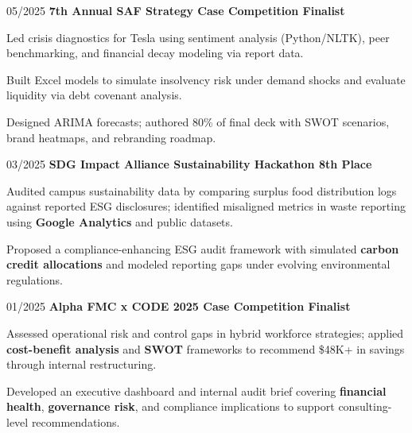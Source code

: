 \begin{twocolentry}{05/2025}
    \textbf{7th Annual SAF Strategy Case Competition Finalist}
\end{twocolentry}
\begin{onecolentry}
\begin{highlights}
\item Led crisis diagnostics for Tesla using sentiment analysis (Python/NLTK), peer benchmarking, and financial decay modeling via report data.
\item Built Excel models to simulate insolvency risk under demand shocks and evaluate liquidity via debt covenant analysis.
\item Designed ARIMA forecasts; authored 80\% of final deck with SWOT scenarios, brand heatmaps, and rebranding roadmap.
\end{highlights}
\end{onecolentry}

\begin{twocolentry}{03/2025}
    \textbf{SDG Impact Alliance Sustainability Hackathon 8th Place}
\end{twocolentry}
\begin{onecolentry}
\begin{highlights}
    \item Audited campus sustainability data by comparing surplus food distribution logs against reported ESG disclosures; identified misaligned metrics in waste reporting using \textbf{Google Analytics} and public datasets.
    \item Proposed a compliance-enhancing ESG audit framework with simulated \textbf{carbon credit allocations} and modeled reporting gaps under evolving environmental regulations.
\end{highlights}
\end{onecolentry}


\begin{twocolentry}{01/2025}
    \textbf{Alpha FMC x CODE 2025 Case Competition Finalist}
\end{twocolentry}
\begin{onecolentry}
\begin{highlights}
    \item Assessed operational risk and control gaps in hybrid workforce strategies; applied \textbf{cost-benefit analysis} and \textbf{SWOT} frameworks to recommend \$48K+ in savings through internal restructuring.
    \item Developed an executive dashboard and internal audit brief covering \textbf{financial health}, \textbf{governance risk}, and compliance implications to support consulting-level recommendations.
\end{highlights}
\end{onecolentry}


